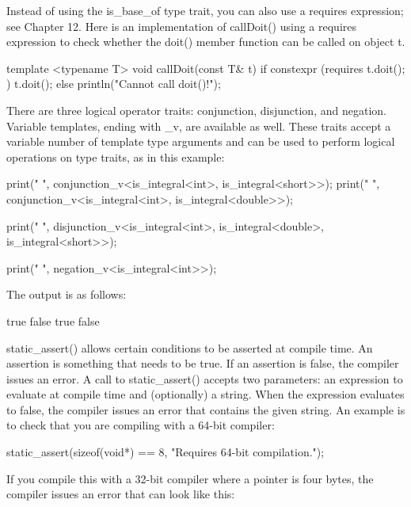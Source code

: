 Instead of using the is\_base\_of type trait, you can also use a requires expression; see Chapter 12. Here is an implementation of callDoit() using a requires expression to check whether the doit() member function can be called on object t.

\begin{cpp}
template <typename T>
void callDoit(const T& t)
{
    if constexpr (requires { t.doit(); }) {
        t.doit();
    } else {
        println("Cannot call doit()!");
    }
}
\end{cpp}


There are three logical operator traits: conjunction, disjunction, and negation. Variable templates, ending with \_v, are available as well. These traits accept a variable number of template type arguments and can be used to perform logical operations on type traits, as in this example:

\begin{cpp}
print("{} ", conjunction_v<is_integral<int>, is_integral<short>>);
print("{} ", conjunction_v<is_integral<int>, is_integral<double>>);

print("{} ", disjunction_v<is_integral<int>, is_integral<double>,
                        is_integral<short>>);

print("{} ", negation_v<is_integral<int>>);
\end{cpp}

The output is as follows:

\begin{shell}
true false true false
\end{shell}


static\_assert() allows certain conditions to be asserted at compile time. An assertion is something that needs to be true. If an assertion is false, the compiler issues an error. A call to static\_assert() accepts two parameters: an expression to evaluate at compile time and (optionally) a string. When the expression evaluates to false, the compiler issues an error that contains the given string. An example is to check that you are compiling with a 64-bit compiler:

\begin{cpp}
static_assert(sizeof(void*) == 8, "Requires 64-bit compilation.");
\end{cpp}

If you compile this with a 32-bit compiler where a pointer is four bytes, the compiler issues an error that can look like this:

